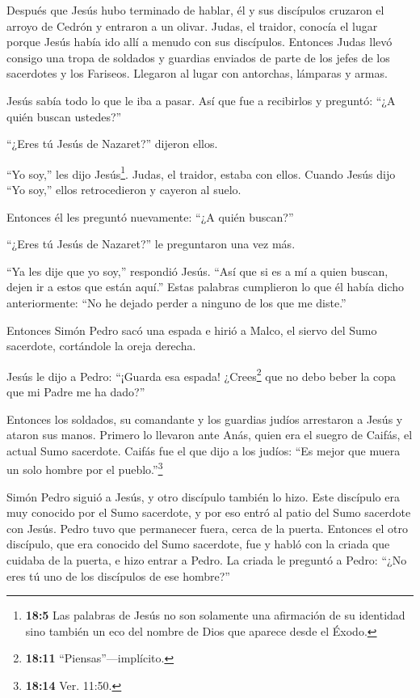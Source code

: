  Después que Jesús hubo terminado de hablar, él y sus
discípulos cruzaron el arroyo de Cedrón y entraron a un olivar.
 Judas, el traidor, conocía el lugar porque Jesús había ido
allí a menudo con sus discípulos.  Entonces Judas llevó
consigo una tropa de soldados y guardias enviados de parte de los jefes
de los sacerdotes y los Fariseos. Llegaron al lugar con antorchas,
lámparas y armas.

 Jesús sabía todo lo que le iba a pasar. Así que fue a
recibirlos y preguntó: ``¿A quién buscan ustedes?''

 ``¿Eres tú Jesús de Nazaret?'' dijeron ellos.

``Yo soy,'' les dijo Jesús\footnote{\textbf{18:5} Las palabras de Jesús
  no son solamente una afirmación de su identidad sino también un eco
  del nombre de Dios que aparece desde el Éxodo.}. Judas, el traidor,
estaba con ellos.  Cuando Jesús dijo ``Yo soy,'' ellos
retrocedieron y cayeron al suelo.

 Entonces él les preguntó nuevamente: ``¿A quién buscan?''

``¿Eres tú Jesús de Nazaret?'' le preguntaron una vez más.

 ``Ya les dije que yo soy,'' respondió Jesús. ``Así que si
es a mí a quien buscan, dejen ir a estos que están aquí.'' 
Estas palabras cumplieron lo que él había dicho anteriormente: ``No he
dejado perder a ninguno de los que me diste.''

 Entonces Simón Pedro sacó una espada e hirió a Malco, el
siervo del Sumo sacerdote, cortándole la oreja derecha.

 Jesús le dijo a Pedro: ``¡Guarda esa espada!
¿Crees\footnote{\textbf{18:11} ``Piensas''---implícito.} que no debo
beber la copa que mi Padre me ha dado?''

 Entonces los soldados, su comandante y los guardias judíos
arrestaron a Jesús y ataron sus manos.  Primero lo llevaron
ante Anás, quien era el suegro de Caifás, el actual Sumo sacerdote.
 Caifás fue el que dijo a los judíos: ``Es mejor que muera
un solo hombre por el pueblo.''\footnote{\textbf{18:14} Ver. 11:50.}

 Simón Pedro siguió a Jesús, y otro discípulo también lo
hizo. Este discípulo era muy conocido por el Sumo sacerdote, y por eso
entró al patio del Sumo sacerdote con Jesús.  Pedro tuvo
que permanecer fuera, cerca de la puerta. Entonces el otro discípulo,
que era conocido del Sumo sacerdote, fue y habló con la criada que
cuidaba de la puerta, e hizo entrar a Pedro.  La criada le
preguntó a Pedro: ``¿No eres tú uno de los discípulos de ese hombre?''

